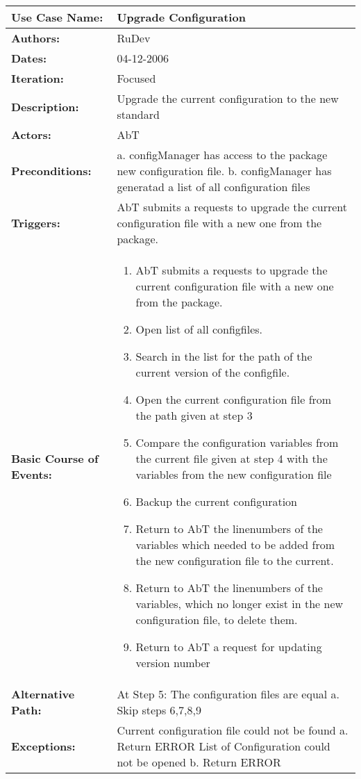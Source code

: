 \begin{tabularx}{\linewidth}{|l|X|}
\hline
\textbf{Use Case Name:} & \textbf{Upgrade Configuration} \\
\hline
\textbf{Authors:} & RuDev \\
\hline
\textbf{Dates:} & 04-12-2006 \\
\hline
\textbf{Iteration:} & Focused \\
\hline
\textbf{Description:} & Upgrade the current configuration to the new standard \\
\hline
\textbf{Actors:} & AbT \\
\hline
\textbf{Preconditions:} & a. configManager has access to the package new configuration file. \newline b. configManager has generatad a list of all configuration files \\
\hline
\textbf{Triggers:} & AbT submits a requests to upgrade the current configuration file with a new one from the package. \\
\hline
\textbf{Basic Course of Events:} & 
\begin{minipage}{\linewidth} 
  \vspace{0.05em}
  \begin{enumerate}
   \item AbT submits a requests to upgrade the current configuration file with a new one from the package.
   \item Open list of all configfiles.
   \item Search in the list for the path of the current version of the configfile.
   \item Open the current configuration file from the path given at step 3
   \item Compare the configuration variables from the current file given at step 4 with the variables from the new configuration file
   \item Backup the current configuration
   \item Return to AbT the linenumbers of the variables which needed to be added from the new configuration file to the current.
   \item Return to AbT the linenumbers of the variables, which no longer exist in the new configuration file, to delete them. 
   \item Return to AbT a request for updating version number
  \end{enumerate}
  \vspace{0.05em}
\end{minipage}
\\
\hline 
\textbf{Alternative Path:} & At Step 5: The configuration files are equal \newline a. Skip steps 6,7,8,9  \\
\hline
\textbf{Exceptions:} & Current configuration file could not be found \newline a. Return ERROR \newline\newline List of Configuration could not be opened \newline b. Return ERROR\\
\hline
\end{tabularx}
